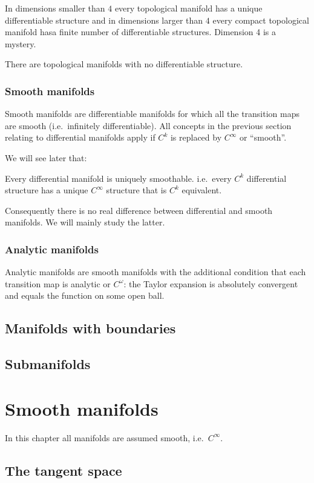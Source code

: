 In dimensions smaller than $4$ every topological manifold has a unique differentiable structure and in dimensions larger than $4$ every compact topological manifold hasa finite number of differentiable structures. Dimension 4 is a mystery.

There are topological manifolds with no differentiable structure.

\subsection{Smooth manifolds}
Smooth manifolds are differentiable manifolds for which all the transition maps are smooth (i.e.\ infinitely differentiable). All concepts in the previous section relating to differential manifolds apply if $C^k$ is replaced by $C^\infty$ or ``smooth''.

We will see later that:
\begin{proposition}
Every differential manifold is uniquely smoothable. i.e.\ every $C^k$ differential structure has a unique $C^\infty$ structure that is $C^k$ equivalent.
\end{proposition}
Consequently there is no real difference between differential and smooth manifolds. We will mainly study the latter.


\subsection{Analytic manifolds}
Analytic manifolds are smooth manifolds with the additional condition that each transition map is analytic or $C^\omega$: the Taylor expansion is absolutely convergent and equals the function on some open ball.

\section{Manifolds with boundaries}

\section{Submanifolds}




\chapter{Smooth manifolds}
In this chapter all manifolds are assumed smooth, i.e.\ $C^\infty$.
\section{The tangent space}
